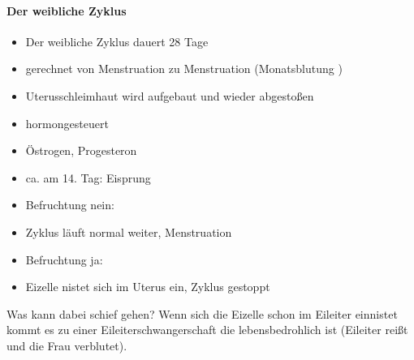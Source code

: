 \documentclass{article}
\begin{document}
\paragraph{Der weibliche Zyklus}
\begin{itemize}
\item Der weibliche Zyklus dauert 28 Tage

\item gerechnet von Menstruation zu Menstruation  (Monatsblutung )

\item Uterusschleimhaut wird aufgebaut und wieder abgesto{\ss}en

\item hormongesteuert

\end{itemize}
\begin{itemize}
\item \"Ostrogen, Progesteron

\end{itemize}
\begin{itemize}
\item ca. am 14. Tag: Eisprung

\item Befruchtung nein: 

\end{itemize}
\begin{itemize}
\item Zyklus l\"auft normal weiter, Menstruation

\end{itemize}
\begin{itemize}
\item Befruchtung ja:

\end{itemize}
\begin{itemize}
\item Eizelle nistet sich im Uterus ein, Zyklus gestoppt

\end{itemize}
Was kann dabei schief gehen? Wenn sich die Eizelle schon im Ei\-leiter
einnistet kommt es zu einer
Eileiter\-schwanger\-schaft die
lebens\-bedrohlich ist (Eileiter rei{\ss}t und die Frau verblutet).
\end{document}
